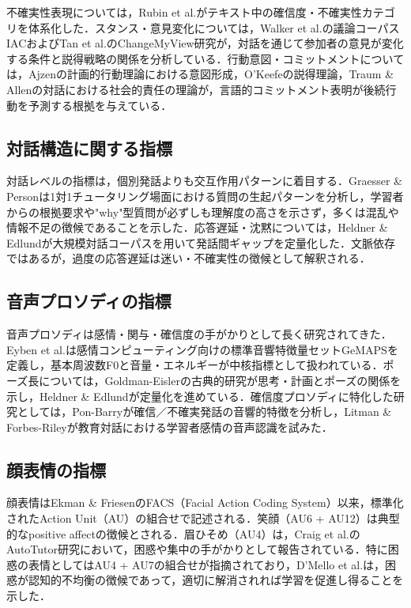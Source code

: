 \documentclass[Japanese]{dicomopapers}
\begin{document}
不確実性表現については，Rubin et al.\cite{Rubin2006}がテキスト中の確信度・不確実性カテゴリを体系化した．スタンス・意見変化については，Walker et al.\cite{Walker2012}の議論コーパスIACおよびTan et al.\cite{Tan2016}のChangeMyView研究が，対話を通じて参加者の意見が変化する条件と説得戦略の関係を分析している．行動意図・コミットメントについては，Ajzen\cite{Ajzen1991}の計画的行動理論における意図形成，O'Keefe\cite{OKeefe2002}の説得理論，Traum \& Allen\cite{Traum1994b}の対話における社会的責任の理論が，言語的コミットメント表明が後続行動を予測する根拠を与えている．

\subsection{対話構造に関する指標}

対話レベルの指標は，個別発話よりも交互作用パターンに着目する．Graesser \& Person\cite{Graesser1994}は1対1チュータリング場面における質問の生起パターンを分析し，学習者からの根拠要求や"why"型質問が必ずしも理解度の高さを示さず，多くは混乱や情報不足の徴候であることを示した．応答遅延・沈黙については，Heldner \& Edlund\cite{Heldner2010}が大規模対話コーパスを用いて発話間ギャップを定量化した．文脈依存ではあるが，過度の応答遅延は迷い・不確実性の徴候として解釈される．

\subsection{音声プロソディの指標}

音声プロソディは感情・関与・確信度の手がかりとして長く研究されてきた．Eyben et al.\cite{Eyben2016}は感情コンピューティング向けの標準音響特徴量セットGeMAPSを定義し，基本周波数F0と音量・エネルギーが中核指標として扱われている．ポーズ長については，Goldman-Eisler\cite{GoldmanEisler1968}の古典的研究が思考・計画とポーズの関係を示し，Heldner \& Edlund\cite{Heldner2010}が定量化を進めている．確信度プロソディに特化した研究としては，Pon-Barry\cite{PonBarry2008}が確信／不確実発話の音響的特徴を分析し，Litman \& Forbes-Riley\cite{Litman2006}が教育対話における学習者感情の音声認識を試みた．

\subsection{顔表情の指標}

顔表情はEkman \& Friesen\cite{Ekman1978}のFACS（Facial Action Coding System）以来，標準化されたAction Unit（AU）の組合せで記述される．笑顔（AU6 + AU12）は典型的なpositive affectの徴候とされる．眉ひそめ（AU4）は，Craig et al.\cite{Craig2008}のAutoTutor研究において，困惑や集中の手がかりとして報告されている．特に困惑の表情としてはAU4 + AU7の組合せが指摘されており，D'Mello et al.\cite{DMello2014}は，困惑が認知的不均衡の徴候であって，適切に解消されれば学習を促進し得ることを示した．
\end{document}
